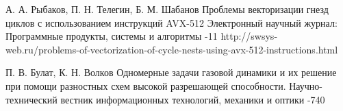 \documentclass[utf8]{psta}
\begin{document}
\begin{thebibliography}{30}
\by А. А. Рыбаков, П. Н. Телегин, Б. М. Шабанов
\paper Проблемы векторизации гнезд циклов с использованием инструкций AVX-512
\jour Электронный научный журнал: Программные продукты, системы и алгоритмы
-11
\URL http://swsys-web.ru/problems-of-vectorization-of-cycle-nests-using-avx-512-instructions.html

\by П. В. Булат, К. Н. Волков
\paper Одномерные задачи газовой динамики и их решение при помощи разностных схем высокой разрешающей способности.
\jour Научно-технический вестник информационных технологий, механики и оптики
-740

\end{thebibliography}
\end{document}
